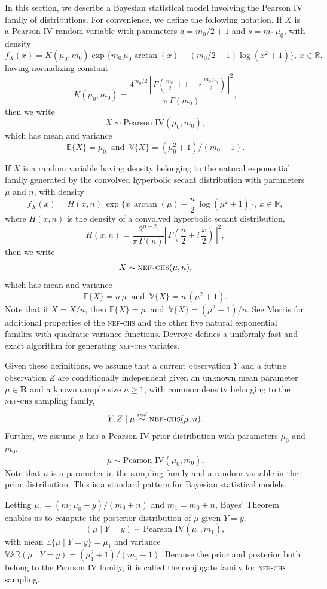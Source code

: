\documentclass[12pt,reqno,tbtags]{amsart}
\newcommand{\EXP}{\mathbb{E}}
\newcommand{\Var}{\mathbb{V}}
\begin{document}
In this section, we describe a Bayesian statistical model involving the Pearson IV family of distributions. For convenience, we define the following notation.
If $X$ is a Pearson IV random variable with parameters $a = m_0/2 + 1$ and $s = m_0\, \mu_0$, with density
$$
f_X(x) = K(\mu_0, m_0) \exp\{m_0\, \mu_0 \arctan(x) - (m_0/2 + 1) \log(x^2 + 1)\},
\ x \in \mathbb{R},
$$
having normalizing constant
$$
K(\mu_0, m_0) = \frac{4^{m_0/2}
\, \left|\, \Gamma\left(\frac{m_0}{2} + 1 - i\, \frac{m_0\, \mu_0}{2}\right)\, \right|^2 }
{\pi\, \Gamma(m_0)},
$$
then we write
$$
X \sim \text{Pearson IV}(\mu_0, m_0),
$$
which has mean and variance
$$
\EXP \{X \} = \mu_0 \ \text{ and }\ \Var \{X \} = (\mu_0^2 + 1)/(m_0 - 1).
$$

If $X$ is a random variable having density belonging to the natural exponential family generated by the convolved hyperbolic secant distribution with parameters $\mu$ and $n$, with density
$$
f_X(x) = H(x, n)\, \exp\{x\, \arctan(\mu) - \frac{n}{2}\, \log(\mu^2 + 1)\},
\ x \in \mathbb{R},
$$
where $H(x, n)$ is the density of a convolved hyperbolic secant distribution,
$$
H(x, n) = \frac{2^{n - 2}}{\pi\, \Gamma(n)} \left|\, \Gamma\left(\frac{n}{2} + i\, \frac{x}{2}\right)\, \right|^2,
$$
then we write
$$
X \sim \textsc{nef-chs}(\mu, n),
$$
which has mean and variance
$$
\EXP \{X \} = n\,\mu \ \text{ and }\ \Var\{X\} = n\, (\mu^2 + 1).
$$
Note that if $\bar{X} = X/n$, then $\EXP \{ \bar{X} \} = \mu \ \text{ and }\ \Var\{ \bar{X} \} = (\mu^2 + 1)/n$.
See Morris \cite{M1, M2} for additional properties of the \textsc{nef-chs} and the other five natural exponential families with quadratic variance functions. Devroye \cite{D3} defines a uniformly fast and exact algorithm for generating \textsc{nef-chs} variates.

Given these definitions, we assume that a current observation $Y$ and a future observation $Z$ are conditionally independent given an unknown mean parameter $\mu \in \mathbf{R}$ and a known sample size $n \geq 1$, with common density belonging to the \textsc{nef-chs} sampling family,
$$
Y, Z \mid \mu \overset{ind}{\sim} \textsc{nef-chs}(\mu, n).
$$
Further, we assume $\mu$ has a Pearson IV prior distribution with parameters $\mu_0$ and $m_0$,
$$
\mu \sim \text{Pearson IV}(\mu_0, m_0).
$$
Note that $\mu$ is a parameter in the sampling family and a random variable in the prior distribution. This is a standard pattern for Bayesian statistical models.

Letting $\mu_1 = (m_0\, \mu_0 + y) / (m_0 + n)$ and $m_1 = m_0 + n$, Bayes' Theorem enables us to compute the posterior distribution of $\mu$ given $Y = y$,
$$
(\mu \mid Y = y) \sim \text{Pearson IV}(\mu_1, m_1),
$$
with mean $\EXP \{\mu \mid Y=y \} = \mu_1$ and variance $\mathbb{VAR}(\mu \mid Y=y) = (\mu_1^2 + 1)/(m_1 - 1)$. Because the prior and posterior both belong to the Pearson IV family, it is called the conjugate family for \textsc{nef-chs} sampling.
\end{document}
